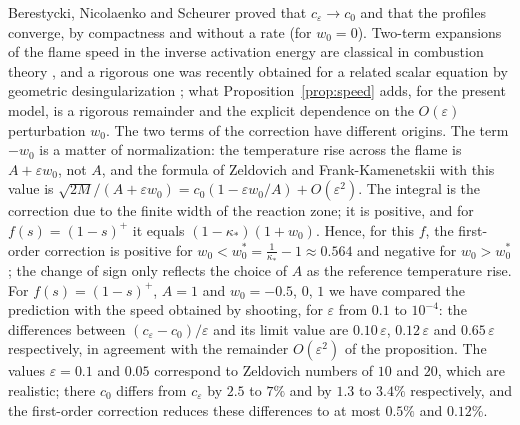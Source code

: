\documentclass[11pt]{amsart}
\theoremstyle{definition}
\theoremstyle{remark}
\newcommand{\ve}{\varepsilon}
\begin{document}
Berestycki, Nicolaenko and Scheurer proved that $c_\ve\to c_0$ and that the
profiles converge, by compactness and without a rate
\cite[Thm.~5.2]{BerestyckiNicolaenkoScheurer1985} (for $w_0=0$). Two-term expansions of
the flame speed in the inverse activation energy are classical in combustion
theory \cite{BushFendell1970,BuckmasterLudford1982}, and a rigorous one was recently
obtained for a related scalar equation by geometric desingularization
\cite{JelbartKristiansenSzmolyan2025}; what Proposition~\ref{prop:speed}
adds, for the present model, is a rigorous remainder and the explicit dependence on the
$O(\ve)$ perturbation $w_0$. The two terms of the correction have different origins. The
term $-w_0$ is a matter of normalization: the temperature rise across the flame is
$A+\ve w_0$, not $A$, and the formula of Zeldovich and Frank-Kamenetskii with this value is
$\sqrt{2M}/(A+\ve w_0)=c_0(1-\ve w_0/A)+O(\ve^2)$. The integral is the correction due to the
finite width of the reaction zone; it is positive, and for $f(s)=(1-s)^+$ it equals
$(1-\kappa_*)(1+w_0)$. Hence, for this $f$, the first-order correction is positive for
$w_0<w_0^*=\frac1{\kappa_*}-1\approx0.564$ and negative for $w_0>w_0^*$; the change of sign
only reflects the choice of $A$ as the reference temperature rise.
For $f(s)=(1-s)^+$, $A=1$ and $w_0=-0.5$, $0$, $1$ we have compared the prediction with
the speed obtained by shooting, for $\ve$ from $0.1$ to $10^{-4}$: the differences
between $(c_\ve-c_0)/\ve$ and its limit value are $0.10\,\ve$, $0.12\,\ve$ and
$0.65\,\ve$ respectively, in agreement with the remainder $O(\ve^2)$ of the proposition. The values $\ve=0.1$ and
$0.05$ correspond to Zeldovich numbers of $10$ and $20$, which are realistic; there $c_0$
differs from $c_\ve$ by $2.5$ to $7\%$ and by $1.3$ to $3.4\%$ respectively, and the
first-order correction reduces these differences to at most $0.5\%$ and $0.12\%$.
\end{document}
